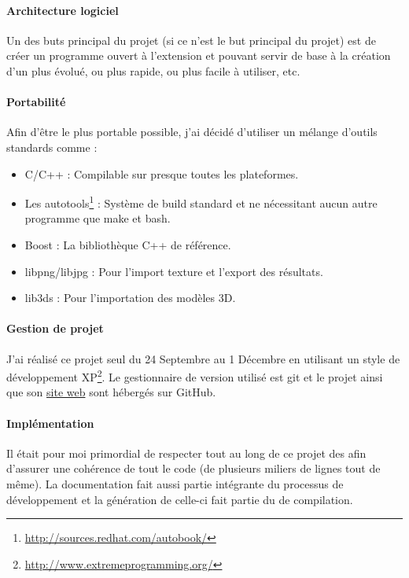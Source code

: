 \paragraph{Architecture logiciel}
Un des buts principal du projet (si ce n'est le but principal du projet) est
de créer un programme ouvert à l'extension et pouvant servir de base à la
création d'un \raytracing plus évolué, ou plus rapide, ou plus facile à
utiliser, etc.

\paragraph{Portabilité}
Afin d'être le plus portable possible, j'ai décidé d'utiliser un mélange
d'outils standards comme :
\begin{itemize}
  \item C/C++ : Compilable sur presque toutes les plateformes.
  \item Les autotools\footnote{\url{http://sources.redhat.com/autobook/}} :
  Système de build standard et ne nécessitant aucun autre programme que make
  et bash.
  \item Boost : La bibliothèque C++ de référence.
  \item libpng/libjpg : Pour l'import texture et l'export des résultats.
  \item lib3ds : Pour l'importation des modèles 3D.
\end{itemize}

\paragraph{Gestion de projet}
J'ai réalisé ce projet seul du 24 Septembre au 1 Décembre en utilisant un
style de développement \gls{XP}\footnote{\url{http://www.extremeprogramming.org/}}.
Le gestionnaire de version utilisé est git et le projet ainsi que son
\href{http://digitalguru.github.com/LyonRayTracer}{site web} sont hébergés sur
GitHub.

\paragraph{Implémentation}
Il était pour moi primordial de respecter tout au long de ce projet des
 afin d'assurer une cohérence de tout le code (de plusieurs
miliers de lignes tout de même). La documentation fait aussi partie intégrante
du processus de développement et la génération de celle-ci fait partie du
 de compilation.

